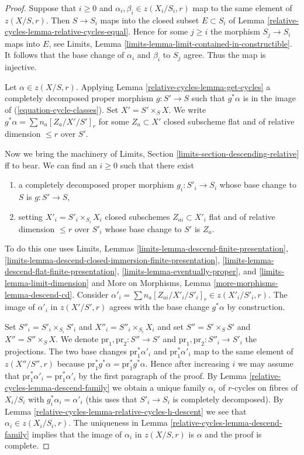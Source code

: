 \begin{proof}
Suppose that $i \geq 0$ and $\alpha_i, \beta_i \in z(X_i/S_i, r)$
map to the same element of $z(X/S, r)$. Then $S \to S_i$
maps into the closed subset $E \subset S_i$ of
Lemma \ref{relative-cycles-lemma-relative-cycles-equal}.
Hence for some $j \geq i$ the morphism $S_j \to S_i$
maps into $E$, see Limits, Lemma
\ref{limits-lemma-limit-contained-in-constructible}.
It follows that the base change of
$\alpha_i$ and $\beta_i$ to $S_j$ agree. Thus the map is injective.

\medskip\noindent
Let $\alpha \in z(X/S, r)$. Applying Lemma \ref{relative-cycles-lemma-get-cycles}
a completely decomposed proper morphism $g : S' \to S$ such that $g^*\alpha$
is in the image of (\ref{equation-cycle-classes}).
Set $X' = S' \times_S X$. We write $g^*\alpha = \sum n_a [Z_a/X'/S']_r$
for some $Z_a \subset X'$ closed subscheme
flat and of relative dimension $\leq r$ over $S'$.

\medskip\noindent
Now we bring the machinery of
Limits, Section \ref{limits-section-descending-relative} ff to bear.
We can find an $i \geq 0$ such that there exist
\begin{enumerate}
\item a completely decomposed proper morphism $g_i : S'_i \to S_i$
whose base change to $S$ is $g : S' \to S$,
\item setting $X'_i = S'_i \times_{S_i} X_i$
closed subschemes $Z_{ai} \subset X'_i$ flat and of
relative dimension $\leq r$ over $S'_i$ whose base change to $S'$
is $Z_a$.
\end{enumerate}
To do this one uses Limits, Lemmas
\ref{limits-lemma-descend-finite-presentation},
\ref{limits-lemma-descend-closed-immersion-finite-presentation},
\ref{limits-lemma-descend-flat-finite-presentation},
\ref{limits-lemma-eventually-proper}, and
\ref{limits-lemma-limit-dimension}
and More on Morphisms, Lemma
\ref{more-morphisms-lemma-descend-cd}.
Consider
$\alpha'_i = \sum n_a [Z_{ai}/X'_i/S'_i]_r \in z(X'_i/S'_i, r)$.
The image of $\alpha'_i$ in $z(X'/S', r)$ agrees with the base change
$g^*\alpha$ by construction.

\medskip\noindent
Set $S''_i = S'_i \times_{S_i} S'_i$ and $X''_i = S''_i \times_{S_i} X_i$
and set $S'' = S' \times_S S'$ and $X'' = S'' \times_S X$.
We denote $\text{pr}_1, \text{pr}_2 : S'' \to S'$ and
$\text{pr}_1, \text{pr}_2 : S''_i \to S'_i$ the projections.
The two base changes $\text{pr}_1^*\alpha'_i$ and $\text{pr}_1^*\alpha'_i$
map to the same element of $z(X''/S'', r)$ because
$\text{pr}_1^*g^*\alpha = \text{pr}_1^*g^*\alpha$.
Hence after increasing $i$ we may assume that
$\text{pr}_1^*\alpha'_i = \text{pr}_1^*\alpha'_i$
by the first paragraph of the proof.
By Lemma \ref{relative-cycles-lemma-descend-family}
we obtain a unique family $\alpha_i$
of $r$-cycles on fibres of $X_i/S_i$
with $g_i^*\alpha_i = \alpha'_i$ (this uses that $S'_i \to S_i$
is completely decomposed).
By Lemma \ref{relative-cycles-lemma-relative-cycles-h-descent}
we see that $\alpha_i \in z(X_i/S_i, r)$.
The uniqueness in Lemma \ref{relative-cycles-lemma-descend-family} implies that the
image of $\alpha_i$ in $z(X/S, r)$ is $\alpha$ and the proof is complete.
\end{proof}

